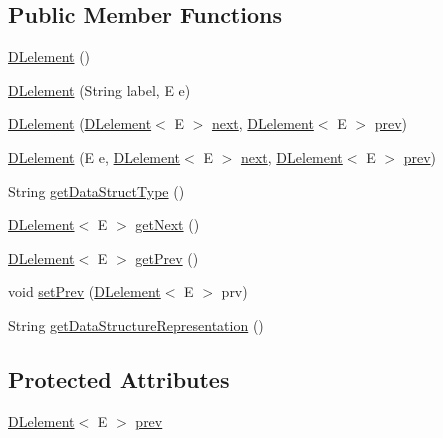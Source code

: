 \subsection*{Public Member Functions}
\begin{DoxyCompactItemize}
\item 
\hyperlink{classbridges_1_1base_1_1_d_lelement_a525b572340e161d9c430baff10b64ab2}{D\+Lelement} ()
\item 
\hyperlink{classbridges_1_1base_1_1_d_lelement_a6aa1d4a3dad4a196c2ed079d108562bc}{D\+Lelement} (String label, E e)
\item 
\hyperlink{classbridges_1_1base_1_1_d_lelement_ab1e4eace66bb1b097463c4f04e964cd0}{D\+Lelement} (\hyperlink{classbridges_1_1base_1_1_d_lelement}{D\+Lelement}$<$ E $>$ \hyperlink{classbridges_1_1base_1_1_s_lelement_abf61c96a74ad319d561c6952ea388e0e}{next}, \hyperlink{classbridges_1_1base_1_1_d_lelement}{D\+Lelement}$<$ E $>$ \hyperlink{classbridges_1_1base_1_1_d_lelement_a6eba4876f820b75ac6bde01d7dea9da7}{prev})
\item 
\hyperlink{classbridges_1_1base_1_1_d_lelement_a3ffba30204a2ea6939b07b0ded123af5}{D\+Lelement} (E e, \hyperlink{classbridges_1_1base_1_1_d_lelement}{D\+Lelement}$<$ E $>$ \hyperlink{classbridges_1_1base_1_1_s_lelement_abf61c96a74ad319d561c6952ea388e0e}{next}, \hyperlink{classbridges_1_1base_1_1_d_lelement}{D\+Lelement}$<$ E $>$ \hyperlink{classbridges_1_1base_1_1_d_lelement_a6eba4876f820b75ac6bde01d7dea9da7}{prev})
\item 
String \hyperlink{classbridges_1_1base_1_1_d_lelement_a4a0e8f7bd377a652927a741e70aae6d3}{get\+Data\+Struct\+Type} ()
\item 
\hyperlink{classbridges_1_1base_1_1_d_lelement}{D\+Lelement}$<$ E $>$ \hyperlink{classbridges_1_1base_1_1_d_lelement_a35e88e8d991d6f23ec63b3ef3f6cce4e}{get\+Next} ()
\item 
\hyperlink{classbridges_1_1base_1_1_d_lelement}{D\+Lelement}$<$ E $>$ \hyperlink{classbridges_1_1base_1_1_d_lelement_a859f08f38513ecdfff0eb11bd2b98ce7}{get\+Prev} ()
\item 
void \hyperlink{classbridges_1_1base_1_1_d_lelement_a152a06add922290d48b2d4affc87d592}{set\+Prev} (\hyperlink{classbridges_1_1base_1_1_d_lelement}{D\+Lelement}$<$ E $>$ prv)
\item 
String \hyperlink{classbridges_1_1base_1_1_d_lelement_aefe2e582992a9e574d733f109add80f2}{get\+Data\+Structure\+Representation} ()
\end{DoxyCompactItemize}
\subsection*{Protected Attributes}
\begin{DoxyCompactItemize}
\item 
\hyperlink{classbridges_1_1base_1_1_d_lelement}{D\+Lelement}$<$ E $>$ \hyperlink{classbridges_1_1base_1_1_d_lelement_a6eba4876f820b75ac6bde01d7dea9da7}{prev}
\end{DoxyCompactItemize}
